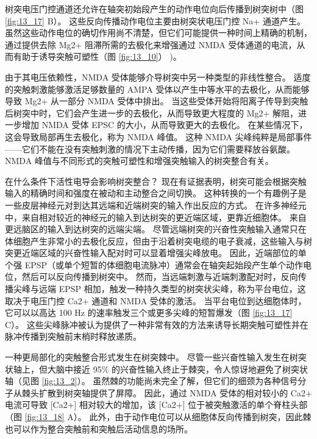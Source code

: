 树突电压门控通道还允许在轴突初始段产生的动作电位向后传播到树突树中（图 \ref{fig:13_17} B）。 
这些反向传播动作电位主要由树突状电压门控 Na+ 通道产生。 
虽然这些动作电位的确切作用尚不清楚，但它们可能提供一种时间上精确的机制，通过提供去除 Mg2+ 阻滞所需的去极化来增强通过 NMDA 受体通道的电流，从而有助于诱导突触可塑性（图 \ref{fig:13_10}） )。


由于其电压依赖性，NMDA 受体能够介导树突中另一种类型的非线性整合。 
适度的突触刺激能够激活足够数量的 AMPA 受体以产生中等水平的去极化，从而能够导致 Mg2+ 从一部分 NMDA 受体中排出。
当这些受体开始将阳离子传导到突触后树突中时，它们会产生进一步的去极化，从而导致更大程度的 Mg2+ 解阻，进一步增加 NMDA 受体 EPSC 的大小，从而导致更大的去极化。 
在某些情况下，这会导致局部再生去极化，称为 NMDA 峰值。 
这种 NMDA 尖峰纯粹是局部事件——它们不能在没有突触刺激的情况下主动传播，因为它们需要释放谷氨酸。 
NMDA 峰值与不同形式的突触可塑性和增强突触输入的树突整合有关。


在什么条件下活性电导会影响树突整合？
现在有证据表明，树突可能会根据突触输入的精确时间和强度在被动和主动整合之间切换。
这种转换的一个有趣例子是一些皮层神经元对到达其远端和近端树突的输入作出反应的方式。
在许多神经元中，来自相对较近的神经元的输入到达树突的更近端区域，更靠近细胞体。
来自更远脑区的输入到达树突的远端尖端。
尽管远端树突的兴奋性突触输入通常只在体细胞产生非常小的去极化反应，但由于沿着树突电缆的电子衰减，这些输入与树突更近端区域的兴奋性输入配对时可以显着增强尖峰放电。
因此，近端部位的单个强 EPSP（或单个短暂的体细胞电流脉冲）通常会在轴突起始段产生单个动作电位，然后可以反向传播到树突中。
然而，当远端刺激与近端刺激配对时，反向传播尖峰与远端 EPSP 相加，触发一种持久类型的树突状尖峰，称为平台电位，这取决于电压门控 Ca2+ 通道和 NMDA 受体的激活。
当平台电位到达细胞体时，它可以以高达 100 Hz 的速率触发三个或更多尖峰的短暂爆发（图 \ref{fig:13_17} C）。
这些尖峰脉冲被认为提供了一种非常有效的方法来诱导长期突触可塑性并在脉冲传播到突触前末梢时释放递质。


一种更局部化的突触整合形式发生在树突棘中。
尽管一些兴奋性输入发生在树突状轴上，但大脑中接近 95\% 的兴奋性输入终止于棘突，令人惊讶地避免了树突状轴（见图 \ref{fig:13_2}）。
虽然棘的功能尚未完全了解，但它们的细颈为各种信号分子从棘头扩散到树突轴提供了屏障。
因此，通过 NMDA 受体的相对较小的 Ca2+ 电流可导致 [Ca2+] 相对较大的增加，该 [Ca2+] 位于被突触激活的单个脊柱头部（图 \ref{fig:13_18} A）。
此外，由于动作电位可以从细胞体反向传播到树突，因此棘也可以作为整合突触前和突触后活动信息的场所。

